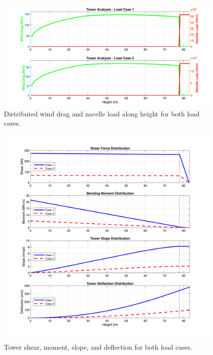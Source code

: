 \documentclass[11pt]{article}
\begin{document}
\begin{figure}[ht]
  \centering
  \includegraphics[width=\textwidth]{Tower_Load_Distribution.png}
  \caption{Distributed wind drag and nacelle load along height for both load cases.}
  \label{fig:tower_load_distribution}
\end{figure}
\begin{figure}[ht]
  \centering
  \includegraphics[width=\textwidth]{Tower_Deflection_Analysis.png}
  \caption{Tower shear, moment, slope, and deflection for both load cases.}
  \label{fig:tower_deflection}
\end{figure}
\end{document}
